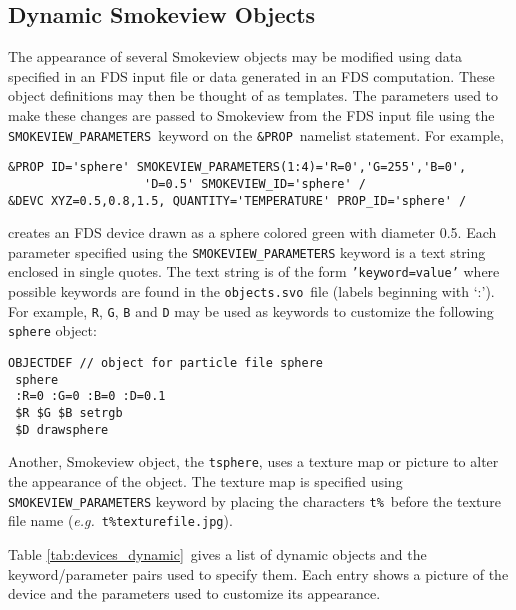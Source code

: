 %
\subsection{Dynamic Smokeview Objects}
The appearance of several Smokeview objects may be modified using data
specified in an FDS input file or data generated in an FDS computation.  These object
definitions may then be thought of as templates. The parameters used to make these
changes are passed to Smokeview from the FDS input file using the {\tt SMOKEVIEW\_PARAMETERS}\
keyword on the {\tt \&PROP}\ namelist statement.  For example,
\begin{verbatim}
&PROP ID='sphere' SMOKEVIEW_PARAMETERS(1:4)='R=0','G=255','B=0',
                   'D=0.5' SMOKEVIEW_ID='sphere' /
&DEVC XYZ=0.5,0.8,1.5, QUANTITY='TEMPERATURE' PROP_ID='sphere' /
\end{verbatim}
creates an FDS device drawn as a sphere colored green with diameter 0.5. Each parameter specified using the
{\tt SMOKEVIEW\_PARAMETERS} keyword
is a text string enclosed in single quotes.  The text string is of the form {\tt 'keyword=value'} where possible
keywords are found in the {\tt objects.svo}\ file (labels beginning with `:').  For example, {\tt R}, {\tt G},
{\tt B} and {\tt D} may be used as keywords to customize the following {\tt sphere} object:
\begin{verbatim}
OBJECTDEF // object for particle file sphere
 sphere
 :R=0 :G=0 :B=0 :D=0.1
 $R $G $B setrgb
 $D drawsphere
\end{verbatim}

Another, Smokeview object, the {\tt tsphere}, uses a texture map or picture to alter the appearance of the object.
The texture map is specified using {\tt SMOKEVIEW\_PARAMETERS} keyword by placing the characters {\tt t\%}\
before the texture file name ({\em e.g.}\ {\tt t\%texturefile.jpg}).

Table \ref{tab:devices_dynamic}\ gives a list of dynamic objects and the keyword/parameter pairs used to specify them.
Each entry shows a picture of the device and the parameters used to customize its appearance.

